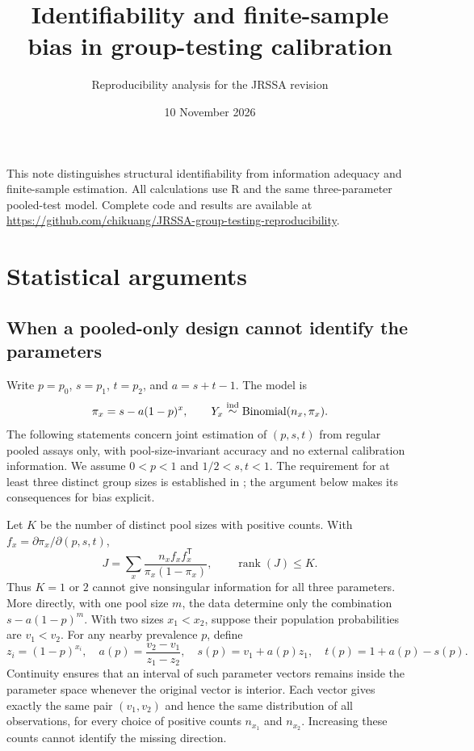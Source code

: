 \documentclass[11pt]{article}
\title{Identifiability and finite-sample bias in group-testing calibration}
\author{Reproducibility analysis for the JRSSA revision}
\date{10 November 2026}
\begin{document}
\maketitle
\noindent This note distinguishes structural identifiability from information adequacy and finite-sample estimation. All calculations use R and the same three-parameter pooled-test model. Complete code and results are available at \url{https://github.com/chikuang/JRSSA-group-testing-reproducibility}.
\section{Statistical arguments}
\subsection{When a pooled-only design cannot identify the parameters}\label{app:identifiability}
Write $p=p_0$, $s=p_1$, $t=p_2$, and $a=s+t-1$. The model is
\[
 \pi_x=s-a(1-p)^x,\qquad
 Y_x\mathrel{\mathop\sim^{\rm ind}}\operatorname{Binomial}(n_x,\pi_x).
\]
The following statements concern joint estimation of $(p,s,t)$ from regular pooled assays only, with pool-size-invariant accuracy and no external calibration information. We assume $0<p<1$ and $1/2<s,t<1$. The requirement for at least three distinct group sizes is established in \citet{huang:2017:design-group}; the argument below makes its consequences for bias explicit.

Let $K$ be the number of distinct pool sizes with positive counts. With $f_x=\partial\pi_x/\partial(p,s,t)$,
\[
 J=\sum_x \frac{n_x f_x f_x^{\mathsf T}}{\pi_x(1-\pi_x)},\qquad
 \operatorname{rank}(J)\leq K.
\]
Thus $K=1$ or $2$ cannot give nonsingular information for all three parameters. More directly, with one pool size $m$, the data determine only the combination $s-a(1-p)^m$. With two sizes $x_1<x_2$, suppose their population probabilities are $v_1<v_2$. For any nearby prevalence $p$, define
\begin{equation}\label{eq:identification-ridge}
 z_i=(1-p)^{x_i},\quad
 a(p)=\frac{v_2-v_1}{z_1-z_2},\quad
 s(p)=v_1+a(p)z_1,\quad t(p)=1+a(p)-s(p).
\end{equation}
Continuity ensures that an interval of such parameter vectors remains inside the parameter space whenever the original vector is interior. Each vector gives exactly the same pair $(v_1,v_2)$ and hence the same distribution of all observations, for every choice of positive counts $n_{x_1}$ and $n_{x_2}$. Increasing these counts cannot identify the missing direction.
\end{document}
